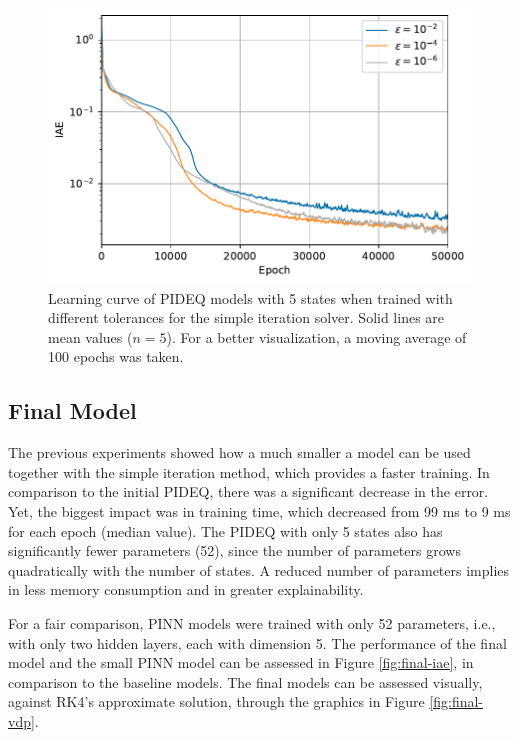 \begin{figure}[h]
    \centering
    \includegraphics{images/exp_6_iae.pdf}
    \caption[Learning curve of \gls{PIDEQ} models with 5 states when trained with different tolerances for the simple iteration solver.]{Learning curve of \gls{PIDEQ} models with 5 states when trained with different tolerances for the simple iteration solver. Solid lines are mean values ($n=5$). For a better visualization, a moving average of 100 epochs was taken.}
    \label{fig:epsilon-iae}
\end{figure}

\subsection{Final Model}

The previous experiments showed how a much smaller a model can be used together with the simple iteration method, which provides a faster training.
In comparison to the initial \gls{PIDEQ}, there was a significant decrease in the error.
Yet, the biggest impact was in training time, which decreased from 99 ms to 9 ms for each epoch (median value). 
The \gls{PIDEQ} with only 5 states also has significantly fewer parameters (52), since the number of parameters grows quadratically with the number of states.
A reduced number of parameters implies in less memory consumption and in greater explainability.

For a fair comparison, \gls{PINN} models were trained with only 52 parameters, i.e., with only two hidden layers, each with dimension 5.
The performance of the final model and the small \gls{PINN} model can be assessed in Figure \ref{fig:final-iae}, in comparison to the baseline models. The final models can be assessed visually, against \gls{RK4}'s approximate solution, through the graphics in Figure \ref{fig:final-vdp}.

